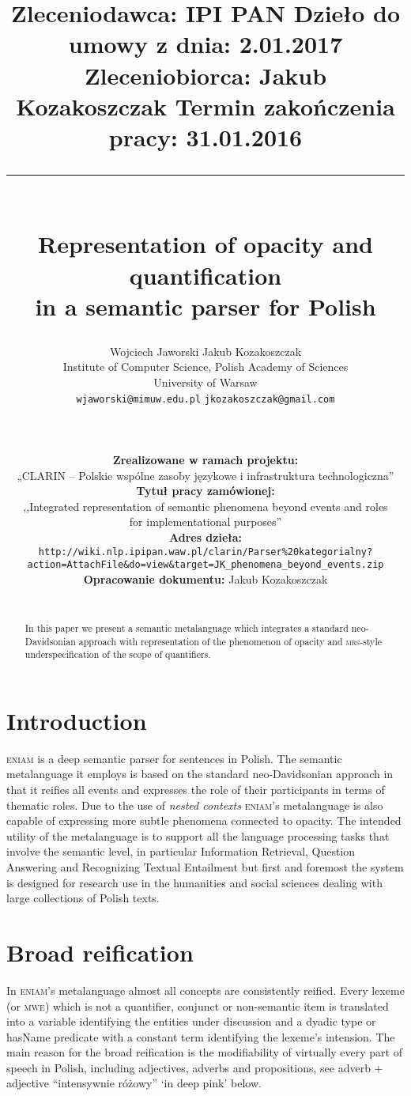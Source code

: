 \documentclass[11pt]{article}
\title{
\normalsize
\setlength{\topsep}{0pt} 
\noindent
Zleceniodawca: IPI PAN \hfill Dzieło do umowy z dnia: 2.01.2017 \\
Zleceniobiorca: Jakub Kozakoszczak \hfill Termin zakończenia pracy: 31.01.2016 \\
\rule{\linewidth}{2pt} \\[6pt] 
\huge 
  Representation of opacity and quantification\\ in a semantic parser for Polish
}
\author{Wojciech Jaworski \hspace{20mm} Jakub Kozakoszczak\\
  Institute of Computer Science, Polish Academy of Sciences\\
  University of Warsaw\\
  {\tt wjaworski@mimuw.edu.pl} \hspace{1mm} {\tt jkozakoszczak@gmail.com}\\
\hspace{-5pt}\rule{\linewidth}{0.5pt}\\
\textbf{Zrealizowane w ramach projektu:}\\ „CLARIN -- Polskie wspólne zasoby językowe i infrastruktura technologiczna”\hfill\\
\textbf{Tytuł pracy zamówionej:}\\ ,,Integrated representation of semantic phenomena beyond events and roles\\ for implementational purposes''\\
\textbf{Adres dzieła:}\\
\texttt{http://wiki.nlp.ipipan.waw.pl/clarin/Parser\%20kategorialny?}\\
\texttt{action=AttachFile\&do=view\&target=JK\_phenomena\_beyond\_events.zip}\\
\textbf{Opracowanie dokumentu:} Jakub Kozakoszczak\\
\rule{\linewidth}{0.5pt}
 }
\date{}
\newcommand{\eniam}{\textsc{eniam}}
\begin{document}
\maketitle
\begin{abstract}
In this paper we present a semantic metalanguage which integrates a standard neo-Davidsonian approach with representation of the phenomenon of opacity and \textsc{mrs}-style underspecification of the scope of quantifiers.

\end{abstract}

\section{Introduction}
\textsc{eniam} is a deep semantic parser for sentences in Polish.
The semantic metalanguage it employs is based on the standard neo-Davidsonian approach in that it reifies all events and expresses the role of their participants in terms of thematic roles. 
Due to the use of \emph{nested contexts} \eniam's metalanguage is also capable of expressing more subtle phenomena connected to opacity.
The intended utility of the
 metalanguage is to support all the language processing tasks that involve the semantic level,
in particular Information Retrieval, Question Answering and Recognizing Textual Entailment but first and foremost
the system is designed for research use in the humanities and social sciences dealing with large collections of Polish texts. 



\section{Broad reification}
In \eniam's metalanguage almost all concepts are consistently reified. Every lexeme (or \textsc{mwe}) which is not a 
quantifier, conjunct or non-semantic item is translated into a variable identifying the entities under discussion and a dyadic {\sc type} or {\sc hasName} predicate with a constant term identifying the lexeme's intension.
The main reason for the broad reification is the modifiability of virtually every part of speech in Polish, including adjectives, adverbs and propositions, see adverb + adjective ``intensywnie różowy'' `in deep pink' below.
\end{document}
